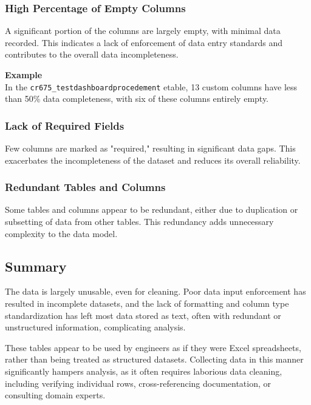 \subsubsection{High Percentage of Empty Columns}
A significant portion of the columns are largely empty, with minimal data recorded. This indicates a lack of enforcement of data entry standards and contributes to the overall data incompleteness.

\textbf{Example}\\
In the \texttt{cr675\_testdashboardprocedement} etable, 13 custom columns have less than 50\% data completeness, with six of these columns entirely empty.

\subsubsection{Lack of Required Fields}
Few columns are marked as "required," resulting in significant data gaps. This exacerbates the incompleteness of the dataset and reduces its overall reliability.

\subsubsection{Redundant Tables and Columns}
Some tables and columns appear to be redundant, either due to duplication or subsetting of data from other tables. This redundancy adds unnecessary complexity to the data model.

\subsection{Summary}
The data is largely unusable, even for cleaning. Poor data input enforcement has resulted in incomplete datasets, and the lack of formatting and column type standardization has left most data stored as text, often with redundant or unstructured information, complicating analysis.

These tables appear to be used by engineers as if they were Excel spreadsheets, rather than being treated as structured datasets. Collecting data in this manner significantly hampers analysis, as it often requires laborious data cleaning, including verifying individual rows, cross-referencing documentation, or consulting domain experts.